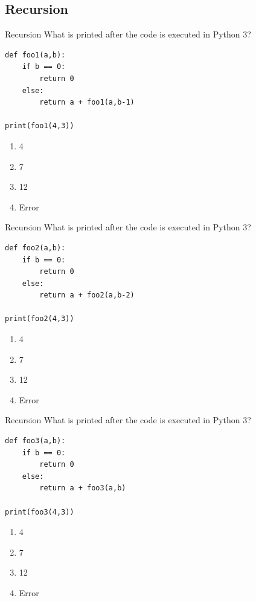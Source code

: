 \documentclass[9pt]{beamer}
\begin{document}
\subsection{Recursion}
\begin{frame}[fragile]{Recursion}
  What is printed after the code is executed in Python 3?
  \begin{lstlisting}
def foo1(a,b):
    if b == 0:
        return 0
    else:
        return a + foo1(a,b-1)

print(foo1(4,3))
  \end{lstlisting}

  \begin{enumerate}
    \item
      4
    \item
      7
    \item
      \alert<2>{12}
    \item
      Error
  \end{enumerate}
\end{frame}

\begin{frame}[fragile]{Recursion}
  What is printed after the code is executed in Python 3?

  \begin{lstlisting}
def foo2(a,b):
    if b == 0:
        return 0
    else:
        return a + foo2(a,b-2)

print(foo2(4,3))
  \end{lstlisting}

  \begin{enumerate}
    \item
      4
    \item
      7
    \item
      12
    \item
      \alert<2>{Error}
  \end{enumerate}
\end{frame}

\begin{frame}[fragile]{Recursion}
  What is printed after the code is executed in Python 3?

  \begin{lstlisting}
def foo3(a,b):
    if b == 0:
        return 0
    else:
        return a + foo3(a,b)

print(foo3(4,3))
  \end{lstlisting}

  \begin{enumerate}
    \item
      4
    \item
      7
    \item
      12
    \item
      \alert<2>{Error}
  \end{enumerate}
\end{frame}
\end{document}
